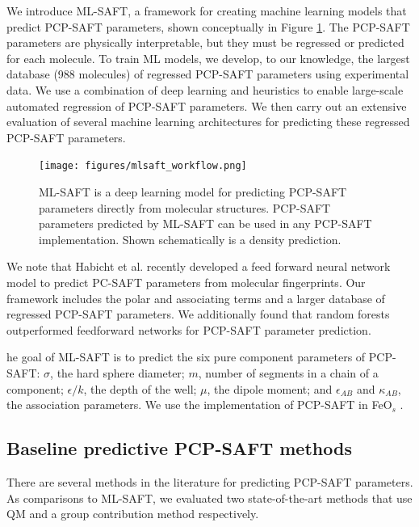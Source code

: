 We introduce ML-SAFT, a framework for creating machine learning models that predict PCP-SAFT parameters, shown conceptually in Figure \ref{fig:ML-SAFT_workflow}. The PCP-SAFT parameters are physically interpretable, but they must be regressed or predicted for each molecule.  To train ML models, we develop, to our knowledge, the largest database (988 molecules) of regressed PCP-SAFT parameters using experimental data. We use a combination of deep learning and heuristics to enable large-scale automated regression of PCP-SAFT parameters. We then carry out an extensive evaluation of several machine learning architectures for predicting these regressed PCP-SAFT parameters.

\begin{figure}
    \centering
    \texttt{[image: figures/mlsaft\_workflow.png]}
    \caption{ML-SAFT is a deep learning model for predicting PCP-SAFT parameters directly from molecular structures. PCP-SAFT parameters predicted by ML-SAFT can be used in any PCP-SAFT implementation. Shown schematically is a density prediction.}
    \label{fig:ML-SAFT_workflow}
\end{figure}

We note that Habicht et al. \cite{Habicht2023} recently developed a feed forward neural network model to predict PC-SAFT parameters from molecular fingerprints. Our framework includes the polar and associating terms and a larger database of regressed PCP-SAFT parameters. We additionally found that random forests outperformed feedforward networks for PCP-SAFT parameter prediction.


he goal of ML-SAFT is to predict the six pure component parameters of PCP-SAFT: $\sigma$, the hard sphere diameter; $m$, number of segments in a chain of a component; $\epsilon/k$, the depth of the well; $\mu$, the dipole moment; and $\epsilon_{AB}$ and $\kappa_{AB}$, the association parameters. We use the implementation of PCP-SAFT in FeO$_{s}$ \cite{Rehner2023}.

\subsection{Baseline predictive PCP-SAFT methods}\label{sec:baselines}

There are several methods in the literature for predicting PCP-SAFT parameters. As comparisons to ML-SAFT, we evaluated two state-of-the-art methods that use QM and a group contribution method respectively.

